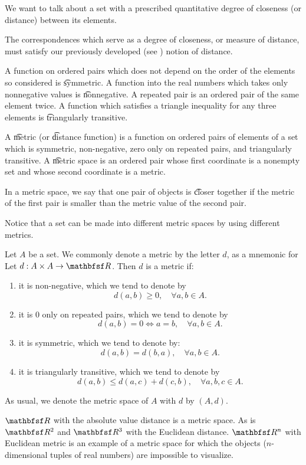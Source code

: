 

We want to talk about a set with a prescribed quantitative degree of closeness (or distance) between its elements.


The correspondences
which serve as a
degree of closeness,
or measure of distance, must
satisfy our previously developed (see ) notion of distance.

A function on ordered pairs which does not depend on the order of the elements so considered is \t{symmetric}.
A function into the real numbers which takes only nonnegative values is \t{nonnegative}.
A repeated pair is an ordered pair of the same element twice.
A function which satisfies a triangle inequality for any three elements is \t{triangularly transitive}.

A \t{metric} (or \t{distance function}) is a function on ordered pairs of elements of a set which is symmetric, non-negative, zero only on repeated pairs, and triangularly transitive.
A \t{metric space} is an ordered pair whose first coordinate is a nonempty set and whose second coordinate is a metric.

In a metric space, we say that one pair of objects is \t{closer} together if the metric of the first pair is smaller than the metric value of the second pair.

Notice that a set can be made into different metric spaces by using different metrics.


Let $A$ be a set.
We commonly denote a metric by the letter $d$, as a mnemonic for 
Let $d: A \times A \to \R$.
Then $d$ is a metric if:
\begin{enumerate}
  \item
    it is non-negative,
    which we tend to denote by
    $$
      d(a, b) \geq 0, \quad \forall a,b \in A.
    $$
  \item
    it is $0$ only on repeated pairs, which we tend to denote
    by
    $$
      d(a, b) = 0 \iff a = b, \quad \forall a,b \in A.
    $$

  \item
    it is symmetric, which we tend to denote by:
    $$
      d(a, b) = d(b, a), \quad \forall a,b \in A.
    $$
  \item
    it is triangularly transitive, which we tend to
    denote by
    $$
      d(a, b) \leq d(a, c) + d(c, b), \quad \forall a,b,c \in A.
    $$
\end{enumerate}
As usual, we denote the metric space
of $A$ with $d$ by
$(A, d)$.


$\R$ with the absolute value distance is a metric space. As is $\R^2$ and $\R^3$ with the Euclidean distance. $\R^n$ with Euclidean metric is an example of a metric space for which the objects ($n$-dimensional tuples of real numbers) are impossible to visualize.
